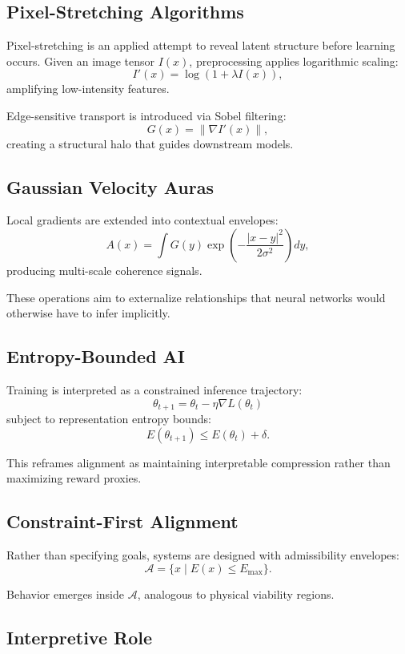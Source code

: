 \documentclass[12pt]{article}
\begin{document}
\subsection{Pixel-Stretching Algorithms}

Pixel-stretching is an applied attempt to reveal latent structure before learning occurs. Given an image tensor $I(x)$, preprocessing applies logarithmic scaling:
\[
I'(x)=\log(1+\lambda I(x)),
\]
amplifying low-intensity features.

Edge-sensitive transport is introduced via Sobel filtering:
\[
G(x)=\|\nabla I'(x)\|,
\]
creating a structural halo that guides downstream models.

\subsection{Gaussian Velocity Auras}

Local gradients are extended into contextual envelopes:
\[
A(x)=\int G(y)\exp\!\left(-\frac{|x-y|^2}{2\sigma^2}\right)dy,
\]
producing multi-scale coherence signals.

These operations aim to externalize relationships that neural networks would otherwise have to infer implicitly.

\subsection{Entropy-Bounded AI}

Training is interpreted as a constrained inference trajectory:
\[
\theta_{t+1}=\theta_t-\eta\nabla L(\theta_t)
\]
subject to representation entropy bounds:
\[
E(\theta_{t+1})\le E(\theta_t)+\delta.
\]

This reframes alignment as maintaining interpretable compression rather than maximizing reward proxies.

\subsection{Constraint-First Alignment}

Rather than specifying goals, systems are designed with admissibility envelopes:
\[
\mathcal{A}=\{x\mid E(x)\le E_{\max}\}.
\]

Behavior emerges inside $\mathcal{A}$, analogous to physical viability regions.

\subsection{Interpretive Role}
\end{document}
